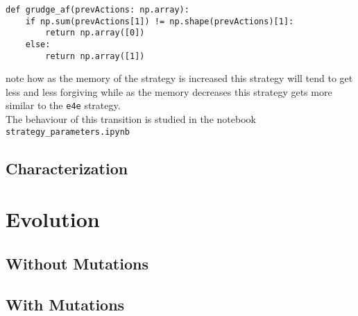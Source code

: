 \documentclass{article}
\begin{document}
\begin{lstlisting}[caption = {Action function for \texttt{grudge\_x}. If 0 is returned then the strategy is defecting and is cooperating otherwise. In the transition region this strategy is nice}]
    def grudge_af(prevActions: np.array):
    if np.sum(prevActions[1]) != np.shape(prevActions)[1]:
        return np.array([0])
    else:
        return np.array([1])
\end{lstlisting}
note how as the memory of the strategy is increased this strategy will tend to get less and less forgiving while as the memory decreases this strategy gets more similar to the \texttt{e4e} strategy. \\
The behaviour of this transition is studied in the notebook \texttt{strategy\_parameters.ipynb}

\subsection{Characterization}

\section{Evolution}

\subsection{Without Mutations}

\subsection{With Mutations}
\end{document}
